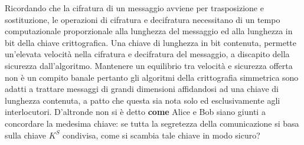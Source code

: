 \documentclass[a4paper,12pt]{tesiinfo}
\begin{document}
Ricordando che la cifratura di un messaggio avviene per trasposizione e sostituzione, le operazioni di cifratura e decifratura necessitano di un tempo computazionale proporzionale alla lunghezza del messaggio ed alla lunghezza in bit della chiave crittografica. Una chiave di lunghezza in bit contenuta, permette un'elevata velocit\`a nella cifratura e decifratura del messaggio, a discapito della sicurezza dall'algoritmo. Mantenere un equilibrio tra velocit\`a e sicurezza offerta non \`e un compito banale pertanto gli algoritmi della crittografia simmetrica sono adatti a trattare messaggi di grandi dimensioni affidandosi ad una chiave di lunghezza contenuta, a patto che questa sia nota solo ed esclusivamente agli interlocutori. D'altronde non si \`e detto \textbf{come} Alice e Bob siano giunti a concordare la medesima chiave: se tutta la segretezza della comunicazione si basa sulla chiave $K^S$ condivisa, come si scambia tale chiave in modo sicuro?
%
%
%
%
%
%
%
%
%
%
\end{document}
